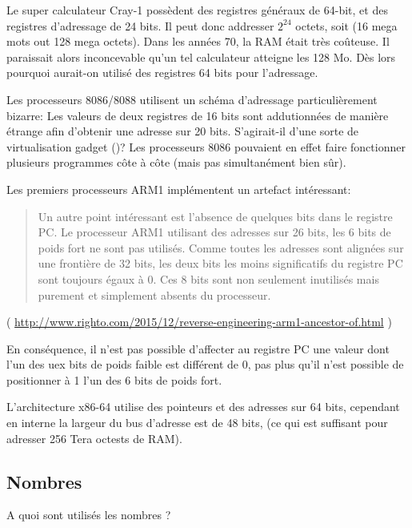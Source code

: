 Le super calculateur Cray-1 possèdent des registres généraux de 64-bit, et des registres d'adressage de 24 bits.
Il peut donc addresser $2^{24}$ octets, soit (16 mega mots out 128 mega octets).
Dans les années 70, la RAM était très coûteuse. Il paraissait alors inconcevable qu'un tel calculateur atteigne
les 128 Mo. Dès lors pourquoi aurait-on utilisé des registres 64 bits pour l'adressage.

Les processeurs 8086/8088 utilisent un schéma d'adressage particulièrement bizarre:
Les valeurs de deux registres de 16 bits sont addutionnées de manière étrange afin d'obtenir une adresse sur 20 bits.
S'agirait-il d'une sorte de virtualisation gadget ()?
Les processeurs 8086 pouvaient en effet faire fonctionner plusieurs programmes côte à côte (mais pas simultanément bien sûr).

Les premiers processeurs ARM1 implémentent un artefact intéressant:

\begin{framed}
\begin{quotation}
Un autre point intéressant est l'absence de quelques bits dans le registre PC. Le processeur ARM1 utilisant des adresses
sur 26 bits, les 6 bits de poids fort ne sont pas utilisés. Comme toutes les adresses sont alignées sur une frontière de
32 bits, les deux bits les moins significatifs du registre PC sont toujours égaux à 0. Ces 8 bits sont non seulement
inutilisés mais purement et simplement absents du processeur.
\end{quotation}
\end{framed}

( \url{http://www.righto.com/2015/12/reverse-engineering-arm1-ancestor-of.html} )

En conséquence, il n'est pas possible d'affecter au registre PC une valeur dont l'un des uex bits de poids faible est
différent de 0, pas plus qu'il n'est possible de positionner à 1 l'un des 6 bits de poids fort.

L'architecture x86-64 utilise des pointeurs et des adresses sur 64 bits, cependant en interne la largeur du bus
d'adresse est de 48 bits, (ce qui est suffisant pour adresser 256 Tera octests de \ac{RAM}).

\subsection{Nombres}

A quoi sont utilisés les nombres ?

